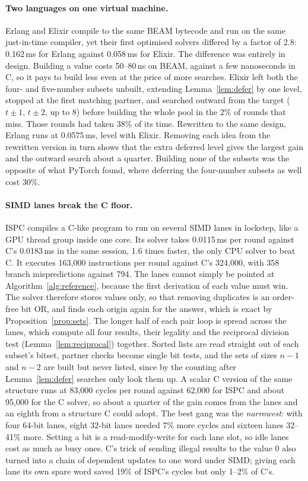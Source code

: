 \documentclass[11pt,a4paper]{article}
\theoremstyle{definition}
\theoremstyle{remark}
\begin{document}
\paragraph{Two languages on one virtual machine.}
Erlang and Elixir compile to the same BEAM bytecode and run on the same just-in-time compiler, yet their first
optimised solvers differed by a factor of 2.8: 0.162\,ms for Erlang against 0.058\,ms for Elixir. The
difference was entirely in design. Building a value costs 50--80\,ns on BEAM, against a few nanoseconds in C,
so it pays to build less even at the price of more searches. Elixir left both the four- and five-number
subsets unbuilt, extending Lemma~\ref{lem:defer} by one level, stopped at the first matching partner, and
searched outward from the target ($t \pm 1$, $t \pm 2$, up to 8) before building the whole pool in the 2\% of
rounds that miss. Those rounds had taken 38\% of its time. Rewritten to the same design, Erlang runs at
0.0575\,ms, level with Elixir. Removing each idea from the rewritten version in turn shows that the extra
deferred level gives the largest gain and the outward search about a quarter. Building none of the
subsets was the opposite of what PyTorch found, where deferring the four-number subsets as well cost 30\%.

\paragraph{SIMD lanes break the C floor.}
ISPC compiles a C-like program to run on several SIMD lanes in lockstep, like a GPU thread group inside one
core. Its solver takes 0.0115\,ms per round against C's 0.0183\,ms in the same session, 1.6 times faster, the
only CPU solver to beat C. It executes 163{,}000 instructions per round against C's 324{,}000, with 358 branch
mispredictions against 794. The lanes cannot simply be pointed at Algorithm~\ref{alg:reference}, because the
first derivation of each value must win. The solver therefore stores values only, so that removing
duplicates is an order-free bit OR, and finds each origin again for the answer, which is exact by
Proposition~\ref{prop:sets}. The longer half of each pair loop is spread across the lanes, which compute all four
results, their legality and the reciprocal division test (Lemma~\ref{lem:reciprocal}) together. Sorted lists
are read straight out of each subset's bitset, partner checks become single bit tests, and the sets of sizes
$n - 1$ and $n - 2$ are built but never listed, since by the counting after Lemma~\ref{lem:defer} searches
only look them up. A scalar C version of the same structure runs at 83{,}000 cycles per round against
62{,}000 for ISPC and about 95{,}000 for the C solver, so about a quarter of the gain comes from the lanes
and an eighth from a structure C could adopt. The best gang was the \emph{narrowest}: with four 64-bit lanes,
eight 32-bit lanes needed 7\% more cycles and sixteen lanes 32--41\% more. Setting a bit is a read-modify-write for each lane
slot, so idle lanes cost as much as busy ones. C's trick of sending illegal results to the value 0 also turned into
a chain of dependent updates to one word under SIMD; giving each lane its own spare word saved 19\% of ISPC's cycles
but only 1--2\% of C's.
\end{document}
